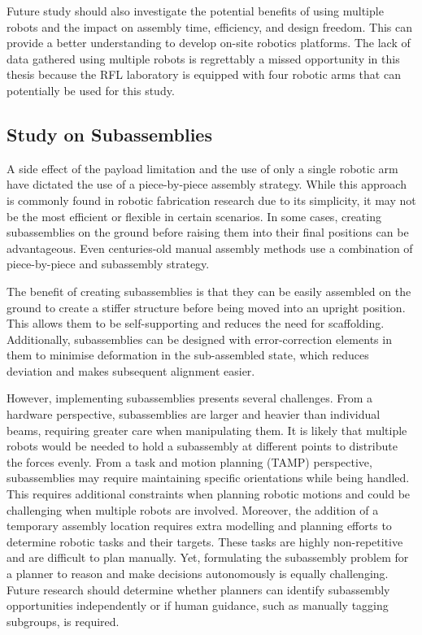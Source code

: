 Future study should also investigate the potential benefits of using multiple robots and the impact on assembly time, efficiency, and design freedom. This can provide a better understanding to develop on-site robotics platforms. The lack of data gathered using multiple robots is regrettably a missed opportunity in this thesis because the RFL laboratory is equipped with four robotic arms that can potentially be used for this study. 

\subsection{Study on Subassemblies}
\label{subsection:study_on_subassemblies}

A side effect of the payload limitation and the use of only a single robotic arm have dictated the use of a piece-by-piece assembly strategy. While this approach is commonly found in robotic fabrication research due to its simplicity, it may not be the most efficient or flexible in certain scenarios. In some cases, creating subassemblies on the ground before raising them into their final positions can be advantageous. Even centuries-old manual assembly methods use a combination of piece-by-piece and subassembly strategy.

The benefit of creating subassemblies is that they can be easily assembled on the ground to create a stiffer structure before being moved into an upright position. This allows them to be self-supporting and reduces the need for scaffolding. Additionally, subassemblies can be designed with error-correction elements in them to minimise deformation in the sub-assembled state, which reduces deviation and makes subsequent alignment easier.

However, implementing subassemblies presents several challenges. From a hardware perspective, subassemblies are larger and heavier than individual beams, requiring greater care when manipulating them. It is likely that multiple robots would be needed to hold a subassembly at different points to distribute the forces evenly. From a task and motion planning (TAMP) perspective, subassemblies may require maintaining specific orientations while being handled. This requires additional constraints when planning robotic motions and could be challenging when multiple robots are involved. Moreover, the addition of a temporary assembly location requires extra modelling and planning efforts to determine robotic tasks and their targets. These tasks are highly non-repetitive and are difficult to plan manually. Yet, formulating the subassembly problem for a planner to reason and make decisions autonomously is equally challenging. Future research should determine whether planners can identify subassembly opportunities independently or if human guidance, such as manually tagging subgroups, is required.


